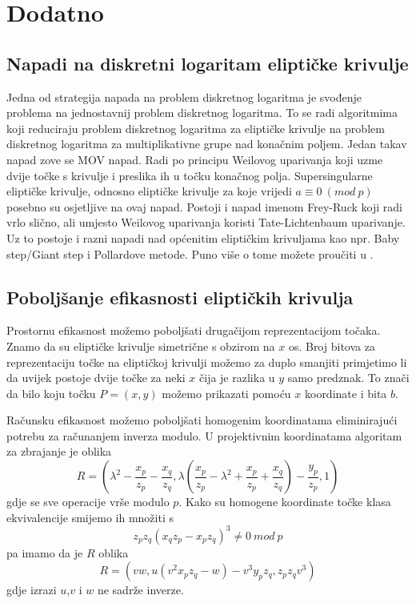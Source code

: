 \documentclass{mathos}
\begin{document}
\chapter{Dodatno}
\section{Napadi na diskretni logaritam eliptičke krivulje}
Jedna od strategija napada na problem diskretnog logaritma je svođenje problema na jednostavnij problem diskretnog logaritma. To se radi algoritmima koji reduciraju problem diskretnog logaritma za eliptičke krivulje na problem diskretnog logaritma za multiplikativne grupe nad konačnim poljem.
Jedan takav napad zove se MOV napad. Radi po principu Weilovog uparivanja koji uzme dvije točke s krivulje i preslika ih u točku konačnog polja. Supersingularne eliptičke krivulje, odnosno eliptičke krivulje za koje vrijedi $a \equiv 0 \ (mod \ p)$ posebno su osjetljive na ovaj napad. Postoji i napad imenom Frey-Ruck koji radi vrlo slično, ali umjesto Weilovog uparivanja koristi Tate-Lichtenbaum uparivanje. Uz to postoje i razni napadi nad općenitim eliptičkim krivuljama kao npr. Baby step/Giant step i Pollardove metode. Puno više o tome možete proučiti u \cite{ECRYPT}.

\section{Poboljšanje efikasnosti eliptičkih krivulja}
Prostornu efikasnost možemo poboljšati drugačijom reprezentacijom točaka. Znamo da su eliptičke krivulje simetrične s obzirom na $x$ os. Broj bitova za reprezentaciju točke na eliptičkoj krivulji možemo za duplo smanjiti primjetimo li da uvijek postoje dvije točke za neki $x$ čija je razlika u $y$ samo predznak. To znači da bilo koju točku $P = (x, y)$ možemo prikazati pomoću $x$ koordinate i bita $b$.

Računsku efikasnost možemo poboljšati homogenim koordinatama eliminirajući potrebu za računanjem inverza modulo. U projektivnim koordinatama algoritam za zbrajanje je oblika
\[ R = \left(\lambda^2 - \frac{x_p}{z_p} - \frac{x_q}{z_q}, \lambda(\frac{x_p}{z_p} - \lambda^2 + \frac{x_p}{z_p} + \frac{x_q}{z_q}) - \frac{y_p}{z_p}, 1\right) \]
gdje se sve operacije vrše modulo $p$. Kako su homogene koordinate točke klasa ekvivalencije smijemo ih množiti s
\[ z_p z_q (x_q z_p - x_p z_q)^3 \neq 0 \ mod \ p \]
pa imamo da je $R$ oblika
\[ R = (vw, u(v^2x_pz_q - w) - v^3y_pz_q, z_pz_qv^3) \]
gdje izrazi $u$,$v$ i $w$ ne sadrže inverze.
\end{document}
